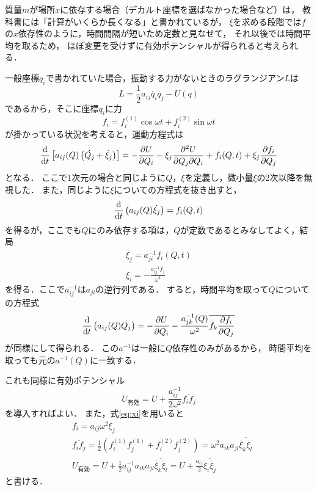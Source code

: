\documentclass[a4paper]{jsarticle}
\newcommand{\dif}[2]{\frac{{\rm d} #1}{{\rm d} #2}}
\newcommand{\pdif}[2]{\frac{\partial #1}{\partial #2}}
\begin{document}
質量$m$が場所$x$に依存する場合（デカルト座標を選ばなかった場合など）は，
教科書には「計算がいくらか長くなる」と書かれているが，
$\xi$を求める段階では$f$の$x$依存性のように，時間間隔が短いため定数と見なせて，
それ以後では時間平均を取るため，
ほぼ変更を受けずに有効ポテンシャルが得られると考えられる．

一般座標$q_i$で書かれていた場合，振動する力がないときのラグランジアン$L$は
\begin{equation}
	L = \frac{1}{2}a_{ij} \dot{q_i} \dot{q_j} - U(q)
\end{equation}
であるから，そこに座標$q_i$に力
\begin{equation}
	f_i = f_i^{(1)} \cos \omega t + f_i^{(2)} \sin \omega t
\end{equation}
が掛かっている状況を考えると，運動方程式は
\begin{equation}
	\dif{}{t} \left[ a_{ij}(Q) \left( \dot{Q_j} + \dot{\xi_j} \right) \right]
	= -\pdif{U}{Q_i} - \xi_j \frac{\partial^2 U}{\partial Q_j \partial Q_i}
	+ f_i (Q, t) + \xi_j \pdif{f_i}{Q_j}
\end{equation}
となる．
ここで1次元の場合と同じように$Q$，$\xi$を定義し，微小量$\xi$の2次以降を無視した．
また，同じように$\xi$についての方程式を抜き出すと，
\begin{equation}
	\dif{}{t} \left( a_{ij}(Q) \dot{\xi_j} \right) = f_i(Q, t)
\end{equation}
を得るが，ここでも$Q$にのみ依存する項は，$Q$が定数であるとみなしてよく，結局
\begin{align}
	\ddot{\xi_j} = a^{-1}_{ji} f_i(Q, t) \\
	\xi_i = -\frac{a^{-1}_{ij} f_j}{\omega^2} \label{eq:xi}
\end{align}
を得る．ここで$a^{-1}_{ij}$は$a_{ji}$の逆行列である．
すると，時間平均を取って$Q$についての方程式
\begin{equation}
	\dif{}{t} \left( a_{ij}(Q) \dot{Q_j} \right) =
	-\pdif{U}{Q_i} - \frac{a^{-1}_{jk}(Q)}{\omega^2}
	\overline{ f_k \pdif{f_i}{Q_j}}
\end{equation}
が同様にして得られる．
この$a^{-1}$は一般に$Q$依存性のみがあるから，
時間平均を取っても元の$a^{-1}(Q)$に一致する．

これも同様に有効ポテンシャル
\begin{equation}
	U_{\mbox{有効}} = U + \frac{a^{-1}_{ij}}{2\omega^2} \overline{f_i f_j}
\end{equation}
を導入すればよい．
また，式\eqref{eq:xi}を用いると
\begin{align}
	&f_i = a_{ij} \omega^2 \xi_j \\
	&\overline{f_i f_j} = \frac{1}{2}
	\left( f_i^{(1)} f_j^{(1)} + f_i^{(2)} f_j^{(2)} \right)
	= \omega^2 a_{ik} a_{jl} \overline{\dot{\xi_k} \dot{\xi_l}} \\
	&U_{\mbox{有効}} = U +
	\frac{1}{2} a^{-1}_{ij} a_{ik} a_{jl} \overline{\dot{\xi_k} \dot{\xi_l}}
	= U + \frac{a_{ij}}{2} \overline{\dot{\xi_i} \dot{\xi_j}}
\end{align}
と書ける．
\end{document}
